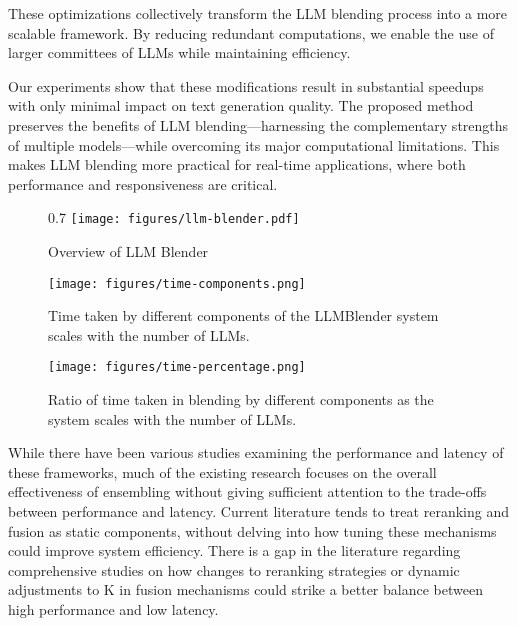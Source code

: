 \documentclass[sigconf,authordraft]{acmart}
\begin{document}
These optimizations collectively transform the LLM blending process into a more scalable framework. By reducing redundant computations, we enable the use of larger committees of LLMs while maintaining efficiency.

Our experiments show that these modifications result in substantial speedups with only minimal impact on text generation quality. The proposed method preserves the benefits of LLM blending—harnessing the complementary strengths of multiple models—while overcoming its major computational limitations. This makes LLM blending more practical for real-time applications, where both performance and responsiveness are critical.





\begin{figure}{0.7\linewidth}
    \centering
    \texttt{[image: figures/llm-blender.pdf]}
    \caption{Overview of LLM Blender}
    \label{fig:llm-blender}
\end{figure}




\begin{figure}[h!] 
    \centering
    \texttt{[image: figures/time-components.png]}
    \caption{Time taken by different components of the LLMBlender system scales with the number of LLMs.}
    \label{fig:time-comp}
\end{figure}

\begin{figure}[h!] 
    \centering
    \texttt{[image: figures/time-percentage.png]}
    \caption{Ratio of time taken in blending by different components as the system scales with the number of LLMs.}
    \label{fig:scale}
\end{figure}

While there have been various studies examining the performance and latency of these frameworks, much of the existing research focuses on the overall effectiveness of ensembling without giving sufficient attention to the trade-offs between performance and latency. Current literature tends to treat reranking and fusion as static components, without delving into how tuning these mechanisms could improve system efficiency. There is a gap in the literature regarding comprehensive studies on how changes to reranking strategies or dynamic adjustments to K in fusion mechanisms could strike a better balance between high performance and low latency.
\end{document}
